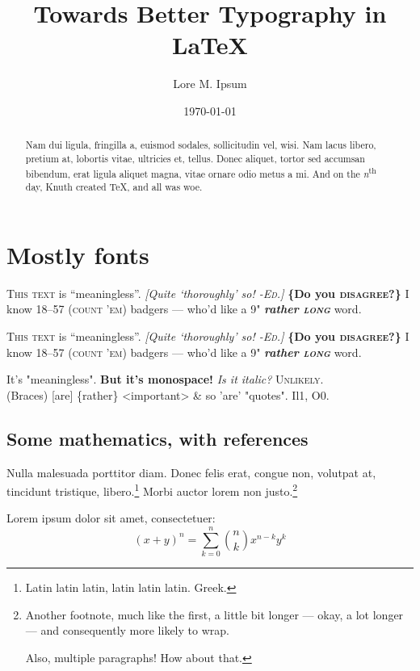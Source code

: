 \documentclass{rntz}
\title{Towards Better Typography in \LaTeX{}}
\author{Lore M. Ipsum}
\date{\today}
\begin{document}
\maketitle

\begin{abstract}
  Nam dui ligula, fringilla a, euismod sodales, sollicitudin vel, wisi. Nam
  lacus libero, pretium at, lobortis vitae, ultricies et, tellus. Donec aliquet,
  tortor sed accumsan bibendum, erat ligula aliquet magna, vitae ornare odio
  metus a mi. And on the \emph{n}\textsuperscript{th} day, Knuth created \TeX,
  and all was woe.
\end{abstract}

\section{Mostly fonts}\label{sec:one}

\newcommand{\testtext}{\textsc{This text} is ``meaningless''. \emph{[Quite
      `thoroughly' so! \textsc{-Ed.}]} {\bfseries \{Do you \textsc{disagree}?\}} I
  know 18--57 (\textsc{count 'em}) badgers --- who'd like a 9"
  {\bfseries\itshape rather \textsc{long}} word.}

\begingroup
\testtext\setlength\parskip{1em}\setlength\parindent{0em}

{\sffamily\testtext}

{\ttfamily It's "meaningless". \textbf{But it's monospace!}
  {\itshape
    Is it italic?} \textsc{Unlikely.}\\
  (Braces) [are] \{rather\} <important> \& so 'are' "quotes".
  Il1, O0.}
\endgroup

\subsection{Some mathematics, with references}

Nulla malesuada porttitor diam. Donec felis erat, congue non, volutpat at,
tincidunt tristique, libero.\footnote{Latin latin latin, latin latin latin.
  Greek.} Morbi auctor lorem non justo.\footnote{Another footnote, much like the
  first, a little bit longer --- okay, a lot longer --- and consequently more
  likely to wrap.\par Also, multiple paragraphs! How about that.}

\begin{theorem}[Binomial]\label{thm:binomial}
  Lorem ipsum dolor sit amet, consectetuer:
  \[ (x+y)^n = \sum_{k=0}^n \binom{n}{k} x^{n-k} y^k \]
\end{theorem}
\end{document}
